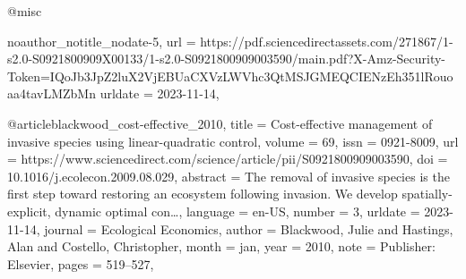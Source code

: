 {@misc{noauthor_notitle_nodate-5,
	url = {https://pdf.sciencedirectassets.com/271867/1-s2.0-S0921800909X00133/1-s2.0-S0921800909003590/main.pdf?X-Amz-Security-Token=IQoJb3JpZ2luX2VjEBUaCXVzLWVhc3QtMSJGMEQCIENzEh351lRouoaa4tavLMZbMn%
	urldate = {2023-11-14},
}

@article{blackwood_cost-effective_2010,
	title = {Cost-effective management of invasive species using linear-quadratic control},
	volume = {69},
	issn = {0921-8009},
	url = {https://www.sciencedirect.com/science/article/pii/S0921800909003590},
	doi = {10.1016/j.ecolecon.2009.08.029},
	abstract = {The removal of invasive species is the first step toward restoring an ecosystem following invasion. We develop spatially-explicit, dynamic optimal con…},
	language = {en-US},
	number = {3},
	urldate = {2023-11-14},
	journal = {Ecological Economics},
	author = {Blackwood, Julie and Hastings, Alan and Costello, Christopher},
	month = jan,
	year = {2010},
	note = {Publisher: Elsevier},
	pages = {519--527},
}

}}
